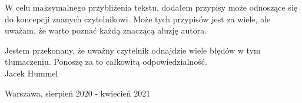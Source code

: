 \documentclass[oneside,polish,12pt,sfheadings]{mwbk}
\begin{document}
W celu maksymalnego przybliżenia tekstu, dodałem przypisy może odnoszące się do koncepcji znanych czytelnikowi. Może tych przypisów jest za wiele, ale uważam, że warto poznać każdą znaczącą aluzję autora.

Jestem przekonany, że uważny czytelnik odnajdzie wiele błędów w tym tłumaczeniu. Ponoszę za to całkowitą odpowiedzialność.\\

Jacek Hummel

Warszawa, sierpień 2020 - kwiecień 2021



\tableofcontents{}
\end{document}
